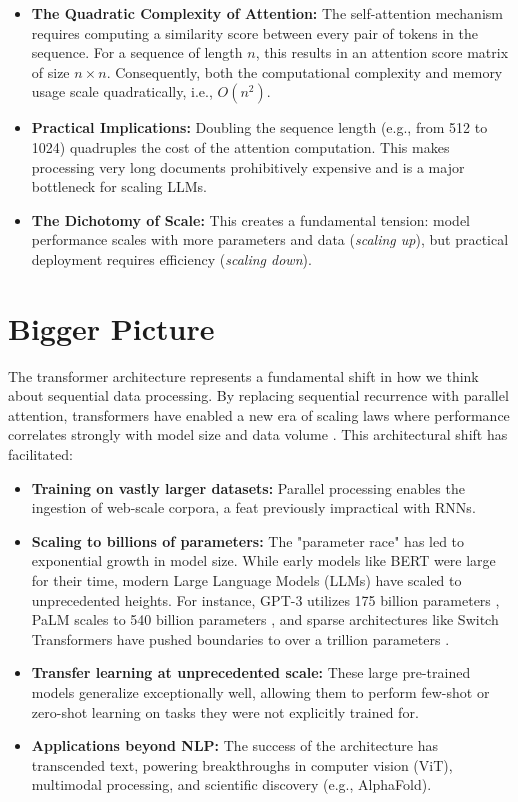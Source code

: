 \begin{itemize}
    \item \textbf{The Quadratic Complexity of Attention:} The self-attention mechanism requires computing a similarity score between every pair of tokens in the sequence. For a sequence of length $n$, this results in an attention score matrix of size $n \times n$. Consequently, both the computational complexity and memory usage scale quadratically, i.e., $O(n^2)$.
    \item \textbf{Practical Implications:} Doubling the sequence length (e.g., from 512 to 1024) quadruples the cost of the attention computation. This makes processing very long documents prohibitively expensive and is a major bottleneck for scaling LLMs.
    \item \textbf{The Dichotomy of Scale:} This creates a fundamental tension: model performance scales with more parameters and data (\textit{scaling up}), but practical deployment requires efficiency (\textit{scaling down}).
\end{itemize}


\section{Bigger Picture}

The transformer architecture represents a fundamental shift in how we think about sequential data processing. By replacing sequential recurrence with parallel attention, transformers have enabled a new era of scaling laws where performance correlates strongly with model size and data volume \cite{kaplan2020scaling}. This architectural shift has facilitated:

\begin{itemize}
    \item \textbf{Training on vastly larger datasets:} Parallel processing enables the ingestion of web-scale corpora, a feat previously impractical with RNNs.
    \item \textbf{Scaling to billions of parameters:} The "parameter race" has led to exponential growth in model size. While early models like BERT were large for their time, modern Large Language Models (LLMs) have scaled to unprecedented heights. For instance, GPT-3 utilizes 175 billion parameters \cite{brown2020language}, PaLM scales to 540 billion parameters \cite{chowdhery2022palm}, and sparse architectures like Switch Transformers have pushed boundaries to over a trillion parameters \cite{fedus2022switch}.
    \item \textbf{Transfer learning at unprecedented scale:} These large pre-trained models generalize exceptionally well, allowing them to perform few-shot or zero-shot learning on tasks they were not explicitly trained for.
    \item \textbf{Applications beyond NLP:} The success of the architecture has transcended text, powering breakthroughs in computer vision (ViT), multimodal processing, and scientific discovery (e.g., AlphaFold).
\end{itemize}

